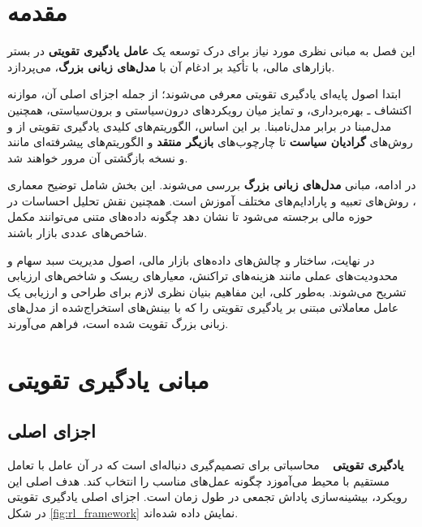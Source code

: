 \documentclass[12pt, a4paper]{report}
\begin{document}
\section{مقدمه}

این فصل به مبانی نظری مورد نیاز برای درک توسعه یک \textbf{عامل یادگیری تقویتی} در بستر بازارهای مالی، با تأکید بر ادغام آن با \textbf{مدل‌های زبانی بزرگ}، می‌پردازد.  

ابتدا اصول پایه‌ای یادگیری تقویتی معرفی می‌شوند؛ از جمله اجزای اصلی آن، موازنه اکتشاف ـ بهره‌برداری، و تمایز میان رویکردهای درون‌سیاستی و برون‌سیاستی، همچنین مدل‌مبنا در برابر مدل‌نا‌مبنا. بر این اساس، الگوریتم‌های کلیدی یادگیری تقویتی از  و روش‌های \textbf{گرادیان سیاست} تا چارچوب‌های \textbf{بازیگر \lr{-} منتقد} و الگوریتم‌های پیشرفته‌ای مانند  و نسخه بازگشتی آن  مرور خواهند شد.  

در ادامه، مبانی \textbf{مدل‌های زبانی بزرگ} بررسی می‌شوند. این بخش شامل توضیح معماری ، روش‌های تعبیه و پارادایم‌های مختلف آموزش است. همچنین نقش تحلیل احساسات در حوزه مالی برجسته می‌شود تا نشان دهد چگونه داده‌های متنی می‌توانند مکمل شاخص‌های عددی بازار باشند.  

در نهایت، ساختار و چالش‌های داده‌های بازار مالی، اصول مدیریت سبد سهام و محدودیت‌های عملی مانند هزینه‌های تراکنش، معیارهای ریسک و شاخص‌های ارزیابی تشریح می‌شوند. به‌طور کلی، این مفاهیم بنیان نظری لازم برای طراحی و ارزیابی یک عامل معاملاتی مبتنی بر یادگیری تقویتی را که با بینش‌های استخراج‌شده از مدل‌های زبانی بزرگ تقویت شده است، فراهم می‌آورند.


\section{مبانی یادگیری تقویتی}

\subsection{اجزای اصلی}

\textbf{یادگیری تقویتی} ~\cite{sutton2018reinforcement} محاسباتی برای تصمیم‌گیری دنباله‌ای است که در آن عامل با تعامل مستقیم با محیط می‌آموزد چگونه عمل‌های مناسب را انتخاب کند. هدف اصلی این رویکرد، بیشینه‌سازی پاداش تجمعی در طول زمان است. اجزای اصلی یادگیری تقویتی در شکل \ref{fig:rl_framework} نمایش داده شده‌اند.  
\end{document}

